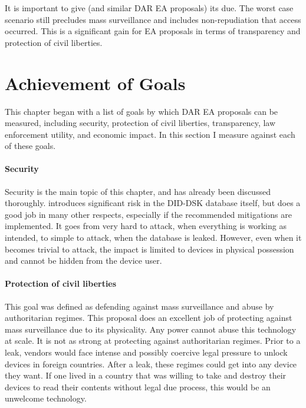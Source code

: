 It is important to give \ldawmsr (and similar \ac{DAR} \ac{EA} proposals) its due. The worst case scenario still
precludes mass surveillance and includes non-repudiation that access occurred. This is a significant gain for \ac{EA}
proposals in terms of transparency and protection of civil liberties.


\section{Achievement of Goals}

This chapter began with a list of goals by which \ac{DAR} \ac{EA} proposals can be measured, including security,
protection of civil liberties, transparency, law enforcement utility, and economic impact. In this section I measure
\ldawmsr against each of these goals.


\paragraph*{Security} Security is the main topic of this chapter, and has already been discussed thoroughly. \ldawmsr
introduces significant risk in the DID-DSK database itself, but does a good job in many other respects, especially if
the recommended mitigations are implemented. It goes from very hard to attack, when everything is working as intended,
to simple to attack, when the database is leaked. However, even when it becomes trivial to attack, the impact is limited
to devices in physical possession and cannot be hidden from the device user.

\paragraph*{Protection of civil liberties} This goal was defined as defending against mass surveillance and abuse by
authoritarian regimes. This proposal does an excellent job of protecting against mass surveillance due to its
physicality. Any power cannot abuse this technology at scale. It is not as strong at protecting against authoritarian
regimes. Prior to a leak, vendors would face intense and possibly coercive legal pressure to unlock devices in foreign
countries. After a leak, these regimes could get into any device they want. If one lived in a country that was willing
to take and destroy their devices to read their contents without legal due process, this would be an unwelcome
technology.

